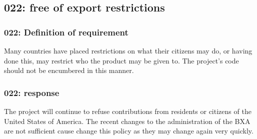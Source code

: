 \subsection{022: free of export restrictions}

\subsubsection{022: Definition of requirement }

Many countries have placed restrictions on what their citizens may do, or
having done this, may restrict who the product may be given to. The project's 
code should not be encumbered in this manner.

\subsubsection{022: response}

The project will continue to refuse contributions from residents or citizens
of the United States of America. The recent changes to the administration of
the BXA are not sufficient cause change this policy as they may change again
very quickly.


